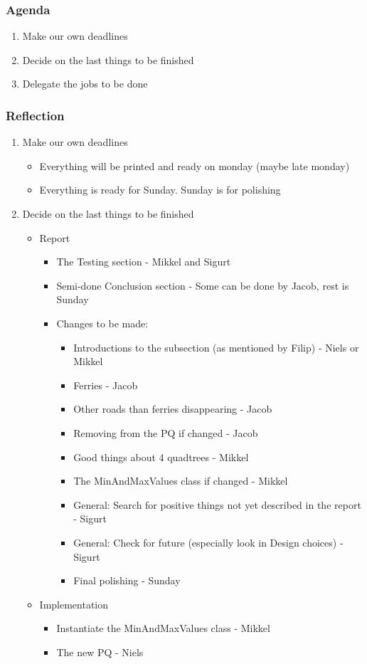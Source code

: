 \subsubsection*{Agenda}
\begin{enumerate}
	\item Make our own deadlines
	\item Decide on the last things to be finished
	\item Delegate the jobs to be done
\end{enumerate}

\subsubsection*{Reflection}
\begin{enumerate}
	\item Make our own deadlines
	\begin{itemize}
		\item Everything will be printed and ready on monday (maybe late monday)
		\item Everything is ready for Sunday. Sunday is for polishing
	\end{itemize}
	\item Decide on the last things to be finished
	\begin{itemize}
		\item Report
		\begin{itemize}
			\item The Testing section - Mikkel and Sigurt
			\item Semi-done Conclusion section - Some can be done by Jacob, rest is Sunday
			\item Changes to be made:
			\begin{itemize}
				\item Introductions to the subsection (as mentioned by Filip)  - Niels or Mikkel
				\item Ferries - Jacob
				\item Other roads than ferries disappearing - Jacob
				\item Removing from the PQ if changed - Jacob
				\item Good things about 4 quadtrees -  Mikkel
				\item The MinAndMaxValues class if changed - Mikkel
				\item General: Search for positive things not yet described in the report - Sigurt
				\item General: Check for future (especially look in Design choices) - Sigurt
				\item Final polishing -  Sunday
			\end{itemize}
		\end{itemize}
		\item Implementation
		\begin{itemize}
			\item Instantiate the MinAndMaxValues class - Mikkel
			\item The new PQ - Niels
		\end{itemize}
	\end{itemize}
	\
\end{enumerate}

